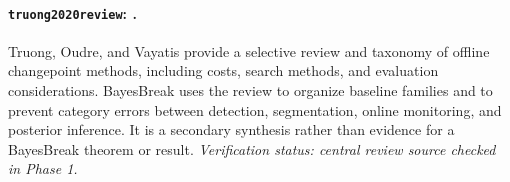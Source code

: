
\paragraph{\texttt{truong2020review}: \citet{truong2020review}.}
Truong, Oudre, and Vayatis provide a selective review and taxonomy of offline changepoint methods, including costs, search methods, and evaluation considerations. BayesBreak uses the review to organize baseline families and to prevent category errors between detection, segmentation, online monitoring, and posterior inference. It is a secondary synthesis rather than evidence for a BayesBreak theorem or result. \textit{Verification status: central review source checked in Phase 1.}
